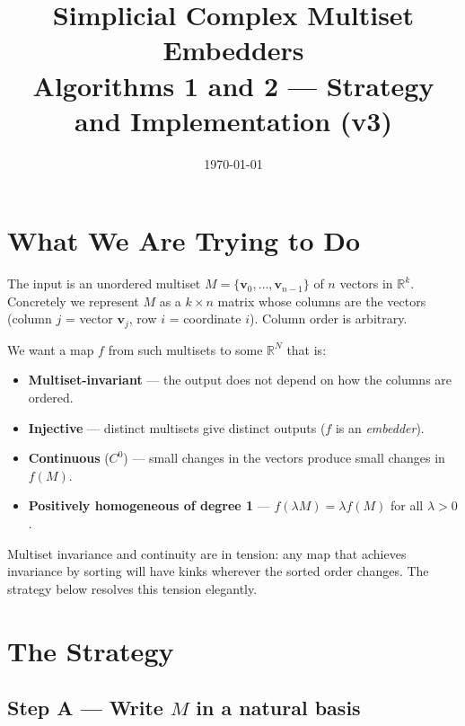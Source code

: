 \documentclass[11pt,a4paper]{article}
\title{\textbf{Simplicial Complex Multiset Embedders}\\[0.4em]
       \large Algorithms 1 and 2 — Strategy and Implementation (v3)}
\date{\today}
\newcommand{\R}{\mathbb{R}}
\begin{document}
\maketitle
\tableofcontents
\bigskip

\section{What We Are Trying to Do}

The input is an unordered multiset $M = \{\mathbf{v}_0,\ldots,\mathbf{v}_{n-1}\}$
of $n$ vectors in $\R^k$.  Concretely we represent $M$ as a $k\times n$ matrix
whose columns are the vectors (column $j$ = vector $\mathbf{v}_j$, row $i$ =
coordinate $i$).  Column order is arbitrary.

We want a map $f$ from such multisets to some $\R^N$ that is:
\begin{itemize}[nosep]
  \item \textbf{Multiset-invariant} — the output does not depend on how the
        columns are ordered.
  \item \textbf{Injective} — distinct multisets give distinct outputs ($f$ is
        an \emph{embedder}).
  \item \textbf{Continuous} ($C^0$) — small changes in the vectors produce
        small changes in $f(M)$.
  \item \textbf{Positively homogeneous of degree 1} — $f(\lambda M) =
        \lambda f(M)$ for all $\lambda > 0$.
\end{itemize}

Multiset invariance and continuity are in tension: any map that achieves
invariance by sorting will have kinks wherever the sorted order changes.
The strategy below resolves this tension elegantly.

\section{The Strategy}
\label{sec:strategy}

\subsection*{Step A — Write $M$ in a natural basis}
\end{document}
